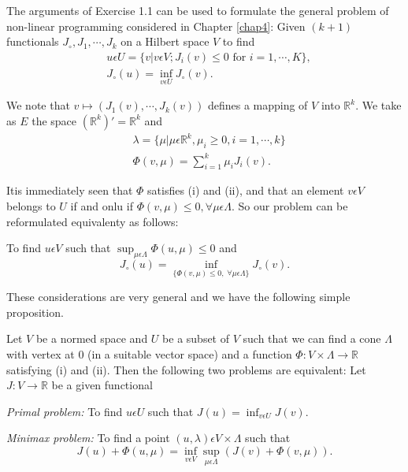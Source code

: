 The arguments of Exercise 1.1 can be used to formulate the general problem of non-linear programming considered in Chapter \ref{chap4}: Given $(k+1)$ functionals $J_{\circ}, J_{1}, \cdots, J_{k}$ on a Hilbert space $V$ to find
\begin{align*}
& u \epsilon U = \{v | v \epsilon V ; J_{i} (v) \leq 0 \text{ for } i = 1, \cdots, K \},\\
& J_{\circ}(u) = \inf_{v \epsilon U} J_{\circ}(v).
\end{align*}

We note that $v \mapsto (J_{1}(v), \cdots, J_{k}(v))$ defines a mapping of $V$ into $\mathbb{R}^{k}$. We take as $E$ the space $(\mathbb{R}^{k})' = \mathbb{R}^{k}$ and
\begin{align*}
& \lambda = \{\mu | \mu \epsilon \mathbb{R}^{k}, \mu_{i} \geq 0, i = 1, \cdots, k\}\\
& \Phi (v, \mu) = \sum_{i=1}^{k} \mu_{i} J_{i} (v).
\end{align*}

It\pageoriginale is immediately seen that $\Phi$ satisfies (i) and (ii), and that an element $v \epsilon V$ belongs to $U$ if and onlu if $\Phi (v, \mu) \leq 0, \forall \mu \epsilon \Lambda$. So our problem can be reformulated equivalenty as follows:

To find $u \epsilon V$ such that $\sup_{\mu \epsilon \Lambda} \Phi (u, \mu) \leq 0$ and
$$
J_{\circ}(u) = \inf\limits_{\{\Phi (v, \mu) \leq 0, \; \forall \mu \epsilon \Lambda\}} J_{\circ}(v).
$$

These considerations are very general and we have the following simple proposition.

\begin{proposition}\label{chap5-prop1.1}
Let $V$ be a normed space and $U$ be a subset of $V$ such that we can find a cone $\Lambda$ with vertex at 0 (in a suitable vector space) and a function $\Phi : V \times \Lambda \to \mathbb{R}$ satisfying (i) and (ii). Then the following two problems are equivalent: Let $J : V \to \mathbb{R}$ be a given functional

{\em Primal problem:} To find $u \epsilon U$ such that $J(u) = \inf_{v \epsilon U} J(v)$.

{\em Minimax problem:} To find a point $(u, \lambda) \epsilon V \times \Lambda$ such that
\begin{equation*}
J(u) + \Phi (u, \mu) = \inf_{v \epsilon V} \sup_{\mu \epsilon \Lambda} (J(v) + \Phi (v, \mu)).\tag{1.3}\label{chap5-eq1.3}
\end{equation*}
\end{proposition}

